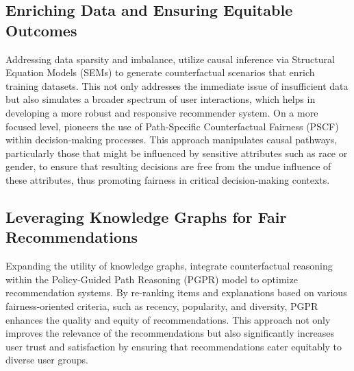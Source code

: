 \subsection{Enriching Data and Ensuring Equitable Outcomes}

Addressing data sparsity and imbalance, \textcite{yang_top-n_2021} utilize causal
inference via Structural Equation Models (SEMs) to generate counterfactual
scenarios that enrich training datasets. This not only addresses the immediate issue
of insufficient data but also simulates a broader spectrum of user interactions,
which helps in developing a more robust and responsive recommender system. On a more
focused level, \textcite{chiappa_path-specific_2019} pioneers the use of Path-Specific Counterfactual
Fairness (PSCF) within decision-making processes. This approach manipulates causal
pathways, particularly those that might be influenced by sensitive attributes
such as race or gender, to ensure that resulting decisions are free from the undue
influence of these attributes, thus promoting fairness in critical decision-making
contexts.

\subsection{Leveraging Knowledge Graphs for Fair Recommendations}

Expanding the utility of knowledge graphs, \textcite{balloccu_post_2022} integrate counterfactual
reasoning within the Policy-Guided Path Reasoning (PGPR) model to optimize recommendation
systems. By re-ranking items and explanations based on various fairness-oriented
criteria, such as recency, popularity, and diversity, PGPR enhances the quality
and equity of recommendations. This approach not only improves the relevance of the
recommendations but also significantly increases user trust and satisfaction by ensuring
that recommendations cater equitably to diverse user groups.